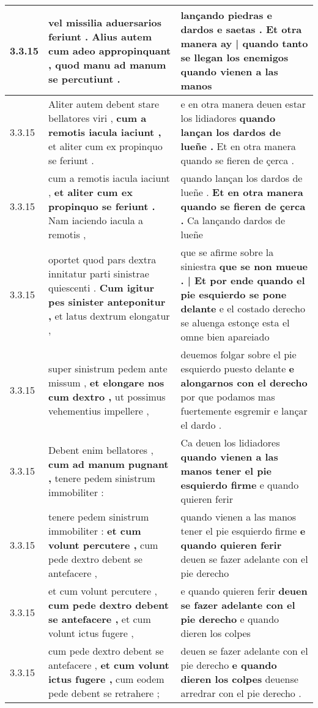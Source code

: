 \begin{tabular}{|p{1cm}|p{6.5cm}|p{6.5cm}|}
3.3.15 & vel missilia aduersarios feriunt . \textbf{ Alius autem cum adeo appropinquant , } quod manu ad manum se percutiunt . & lançando piedras e dardos e saetas . \textbf{ Et otra manera ay | quando tanto se llegan los enemigos } quando vienen a las manos \\\hline
3.3.15 & Aliter autem debent stare bellatores viri , \textbf{ cum a remotis iacula iaciunt , } et aliter cum ex propinquo se feriunt . & e en otra manera deuen estar los lidiadores \textbf{ quando lançan los dardos de lueñe . } Et en otra manera quando se fieren de çerca . \\\hline
3.3.15 & cum a remotis iacula iaciunt , \textbf{ et aliter cum ex propinquo se feriunt . } Nam iaciendo iacula a remotis , & quando lançan los dardos de lueñe . \textbf{ Et en otra manera quando se fieren de çerca . } Ca lançando dardos de lueñe \\\hline
3.3.15 & oportet quod pars dextra innitatur parti sinistrae quiescenti . \textbf{ Cum igitur pes sinister anteponitur , } et latus dextrum elongatur , & que se afirme sobre la siniestra \textbf{ que se non mueue . | Et por ende quando el pie esquierdo se pone delante } e el costado derecho se aluenga estonçe esta el omne bien apareiado \\\hline
3.3.15 & super sinistrum pedem ante missum , \textbf{ et elongare nos cum dextro , } ut possimus vehementius impellere , & deuemos folgar sobre el pie esquierdo puesto delante \textbf{ e alongarnos con el derecho } por que podamos mas fuertemente esgremir e lançar el dardo . \\\hline
3.3.15 & Debent enim bellatores , \textbf{ cum ad manum pugnant , } tenere pedem sinistrum immobiliter : & Ca deuen los lidiadores \textbf{ quando vienen a las manos tener el pie esquierdo firme } e quando quieren ferir \\\hline
3.3.15 & tenere pedem sinistrum immobiliter : \textbf{ et cum volunt percutere , } cum pede dextro debent se antefacere , & quando vienen a las manos tener el pie esquierdo firme \textbf{ e quando quieren ferir } deuen se fazer adelante con el pie derecho \\\hline
3.3.15 & et cum volunt percutere , \textbf{ cum pede dextro debent se antefacere , } et cum volunt ictus fugere , & e quando quieren ferir \textbf{ deuen se fazer adelante con el pie derecho } e quando dieren los colpes \\\hline
3.3.15 & cum pede dextro debent se antefacere , \textbf{ et cum volunt ictus fugere , } cum eodem pede debent se retrahere ; & deuen se fazer adelante con el pie derecho \textbf{ e quando dieren los colpes } deuense arredrar con el pie derecho . \\\hline

\end{tabular}
